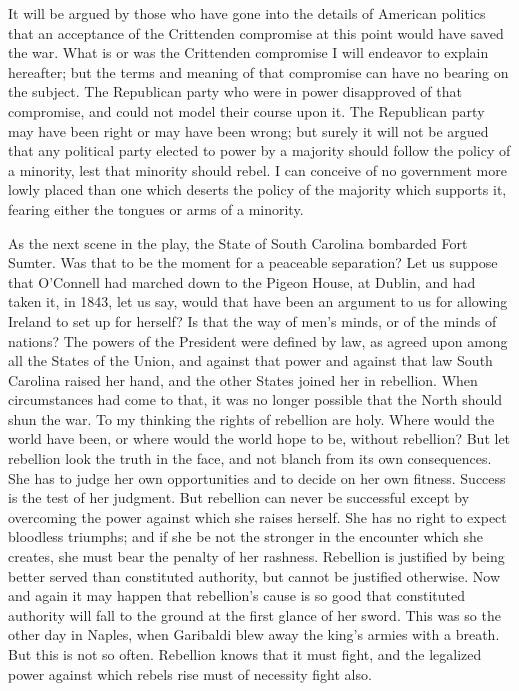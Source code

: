 It will be argued by those who have gone into the details of
American politics that an acceptance of the Crittenden compromise
at this point would have saved the war.  What is or was the
Crittenden compromise I will endeavor to explain hereafter; but the
terms and meaning of that compromise can have no bearing on the
subject.  The Republican party who were in power disapproved of
that compromise, and could not model their course upon it.  The
Republican party may have been right or may have been wrong; but
surely it will not be argued that any political party elected to
power by a majority should follow the policy of a minority, lest
that minority should rebel.  I can conceive of no government more
lowly placed than one which deserts the policy of the majority
which supports it, fearing either the tongues or arms of a
minority.

As the next scene in the play, the State of South Carolina
bombarded Fort Sumter.  Was that to be the moment for a peaceable
separation?  Let us suppose that O'Connell had marched down to the
Pigeon House, at Dublin, and had taken it, in 1843, let us say,
would that have been an argument to us for allowing Ireland to set
up for herself?  Is that the way of men's minds, or of the minds of
nations?  The powers of the President were defined by law, as
agreed upon among all the States of the Union, and against that
power and against that law South Carolina raised her hand, and the
other States joined her in rebellion.  When circumstances had come
to that, it was no longer possible that the North should shun the
war.  To my thinking the rights of rebellion are holy.  Where would
the world have been, or where would the world hope to be, without
rebellion?  But let rebellion look the truth in the face, and not
blanch from its own consequences.  She has to judge her own
opportunities and to decide on her own fitness.  Success is the
test of her judgment.  But rebellion can never be successful except
by overcoming the power against which she raises herself.  She has
no right to expect bloodless triumphs; and if she be not the
stronger in the encounter which she creates, she must bear the
penalty of her rashness.  Rebellion is justified by being better
served than constituted authority, but cannot be justified
otherwise.  Now and again it may happen that rebellion's cause is
so good that constituted authority will fall to the ground at the
first glance of her sword.  This was so the other day in Naples,
when Garibaldi blew away the king's armies with a breath.  But this
is not so often.  Rebellion knows that it must fight, and the
legalized power against which rebels rise must of necessity fight
also.


